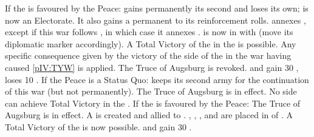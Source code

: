\begin{digressions}


  \aparag If the \ligue is favoured by the Peace:
  \bparag \paysBaviere gains permanently its second \ARMY and \paysPalatinat
  loses its own; \paysBaviere is now an Electorate.  It also gains a permanent
   to its reinforcement rolls.
  \bparag \paysBaviere annexes \provinceOberPfalz, except if this war follows
  , in which case it annexes
  \provinceSchwaben.
  \bparag \paysBaviere is now in \AM with \HAB (move its diplomatic marker
  accordingly).
  \bparag A Total Victory of the \ligue in the  is possible.
  \bparag Any specific consequence given by the victory of the side of the
  \ligue in the war having caused \ref{pIV:TYW} is applied.
  \bparag The Truce of Augsburg is revoked.
  \bparag \SPA and \AUS gain 30 \PV, \SUE loses 10 \PV.
  \aparag If the Peace is a Status Quo:
  \bparag \paysBaviere keeps its second army for the continuation of this war
  (but not permanently).
  \bparag The Truce of Augsburg is in effect.
  \bparag No side can achieve Total Victory in the .
  \aparag If the \alliance is favoured by the Peace:
  \bparag The Truce of Augsburg is in effect.
  \bparag A  is created and allied to
  \HOL.
  \bparag \paysOldenburg, \paysHanovre, \paysHesse, \paysHanse and \paysBerg
  are placed in \EG of \HOL.
  \bparag A Total Victory of the \alliance is now possible.
  \bparag \HOL and \SUE gain 30 \PV.



\end{digressions}

